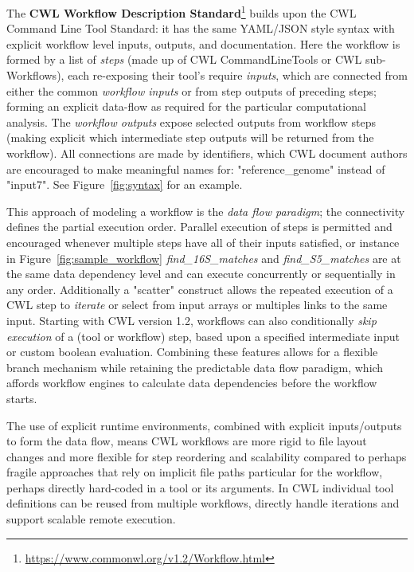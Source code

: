 \documentclass[sigconf,authordraft]{acmart}
\begin{document}
The \textbf{CWL Workflow Description Standard}\footnote{\url{https://www.commonwl.org/v1.2/Workflow.html}} builds upon the CWL Command Line Tool Standard: it has the same YAML/JSON style syntax with explicit workflow level inputs, outputs, and documentation. Here the workflow is formed by a list of \textit{steps} (made up of CWL CommandLineTools or CWL sub-Workflows), each re-exposing their tool's require \textit{inputs}, which are connected from either the common \textit{workflow inputs} or from step outputs of preceding steps; forming an explicit data-flow as required for the particular computational analysis. The \textit{workflow outputs} expose selected outputs from workflow steps (making explicit which intermediate step outputs will be returned from the workflow). All connections are made by identifiers, which CWL document authors are encouraged to make meaningful names for: "reference\_genome" instead of "input7". See Figure~\ref{fig:syntax} for an example.

This approach of modeling a workflow is the \textit{data flow paradigm}; the connectivity defines the partial execution order. Parallel execution of steps is permitted and encouraged whenever multiple steps have all of their inputs satisfied, or instance in Figure~\ref{fig:sample_workflow} \textit{find\_16S\_matches} and \textit{find\_S5\_matches} are at the same data dependency level and can execute concurrently or sequentially in any order. Additionally a "scatter" construct allows the repeated execution of a CWL step to \textit{iterate} or select from input arrays or multiples links to the same input. Starting with CWL version 1.2, workflows can also conditionally \textit{skip execution} of a (tool or workflow) step, based upon a specified intermediate input or custom boolean evaluation. Combining these features allows for a flexible branch mechanism while retaining the predictable data flow paradigm, which affords workflow engines to calculate data dependencies before the workflow starts.

The use of explicit runtime environments, combined with explicit inputs/outputs to form the data flow, means CWL workflows are more rigid to file layout changes and more flexible for step reordering and scalability compared to perhaps fragile approaches that rely on implicit file paths particular for the workflow, perhaps directly hard-coded in a tool or its arguments. In CWL individual tool definitions can be reused from multiple workflows, directly handle iterations and support scalable remote execution.
\end{document}
